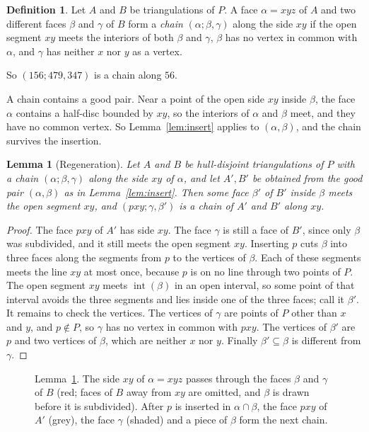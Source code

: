 \documentclass[11pt]{amsart}
\newtheorem{lemma}[theorem]{Lemma}
\theoremstyle{definition}
\newtheorem{definition}[theorem]{Definition}
\newcommand{\inter}{\operatorname{int}}
\begin{document}
\begin{definition}
Let $A$ and $B$ be triangulations of $P$. A face $\alpha=xyz$ of $A$ and two different faces $\beta$ and $\gamma$ of $B$ form a \emph{chain} $(\alpha;\beta,\gamma)$ along the side $xy$ if the open segment $xy$ meets the interiors of both $\beta$ and $\gamma$, $\beta$ has no vertex in common with $\alpha$, and $\gamma$ has neither $x$ nor $y$ as a vertex.
\end{definition}

So $(156;479,347)$ is a chain along $56$.

A chain contains a good pair. Near a point of the open side $xy$ inside $\beta$, the face $\alpha$ contains a half-disc bounded by $xy$, so the interiors of $\alpha$ and $\beta$ meet, and they have no common vertex. So Lemma~\ref{lem:insert} applies to $(\alpha,\beta)$, and the chain survives the insertion.

\begin{lemma}[Regeneration]\label{lem:regen}
Let $A$ and $B$ be hull-disjoint triangulations of $P$ with a chain $(\alpha;\beta,\gamma)$ along the side $xy$ of $\alpha$, and let $A',B'$ be obtained from the good pair $(\alpha,\beta)$ as in Lemma~\ref{lem:insert}. Then some face $\beta'$ of $B'$ inside $\beta$ meets the open segment $xy$, and $(pxy;\gamma,\beta')$ is a chain of $A'$ and $B'$ along $xy$.
\end{lemma}

\begin{proof}
The face $pxy$ of $A'$ has side $xy$. The face $\gamma$ is still a face of $B'$, since only $\beta$ was subdivided, and it still meets the open segment $xy$. Inserting $p$ cuts $\beta$ into three faces along the segments from $p$ to the vertices of $\beta$. Each of these segments meets the line $xy$ at most once, because $p$ is on no line through two points of $P$. The open segment $xy$ meets $\inter(\beta)$ in an open interval, so some point of that interval avoids the three segments and lies inside one of the three faces; call it $\beta'$. It remains to check the vertices. The vertices of $\gamma$ are points of $P$ other than $x$ and $y$, and $p\notin P$, so $\gamma$ has no vertex in common with $pxy$. The vertices of $\beta'$ are $p$ and two vertices of $\beta$, which are neither $x$ nor $y$. Finally $\beta'\subseteq\beta$ is different from $\gamma$.
\end{proof}

\begin{figure}[t]
\centering
\caption{Lemma~\ref{lem:regen}. The side $xy$ of $\alpha=xyz$ passes through the faces $\beta$ and $\gamma$ of $B$ (red; faces of $B$ away from $xy$ are omitted, and $\beta$ is drawn before it is subdivided). After $p$ is inserted in $\alpha\cap\beta$, the face $pxy$ of $A'$ (grey), the face $\gamma$ (shaded) and a piece of $\beta$ form the next chain.}\label{fig:chain}
\end{figure}
\end{document}
